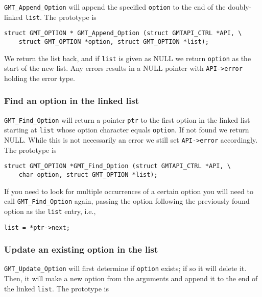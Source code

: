 \documentclass[11pt]{report}
\begin{document}
\texttt{GMT\_Append\_Option} will append the specified \texttt{option} to the end
of the doubly-linked \texttt{list}.  The prototype is

\begin{verbatim}
struct GMT_OPTION * GMT_Append_Option (struct GMTAPI_CTRL *API, \
    struct GMT_OPTION *option, struct GMT_OPTION *list);
\end{verbatim}
We return the list back, and if \texttt{list} is given as NULL we return \texttt{option} as the start of the new list.
Any errors results in a NULL pointer with \texttt{API->error} holding the error type.

\subsubsection{Find an option in the linked list}

\texttt{GMT\_Find\_Option} will return a pointer \texttt{ptr} to the first option in the linked list starting
at \texttt{list} whose option character equals \texttt{option}.  If not found we return NULL.  While this is
not necessarily an error we still set \texttt{API->error} accordingly.
The prototype is

\begin{verbatim}
struct GMT_OPTION *GMT_Find_Option (struct GMTAPI_CTRL *API, \
    char option, struct GMT_OPTION *list);
\end{verbatim}
If you need to look for multiple occurrences of a certain option you will need to
call \texttt{GMT\_Find\_Option} again, passing the option following the
previously found option as the \texttt{list} entry, i.e.,

\begin{verbatim}
list = *ptr->next;
\end{verbatim}

\subsubsection{Update an existing option in the list}
\index{Option!Update}

\texttt{GMT\_Update\_Option} will first determine if \texttt{option} exists;
if so it will delete it. Then, it will make a new option from the arguments
and append it to the end of the linked \texttt{list}.  The prototype is
\index{GMT\_Update\_Option}
\end{document}
